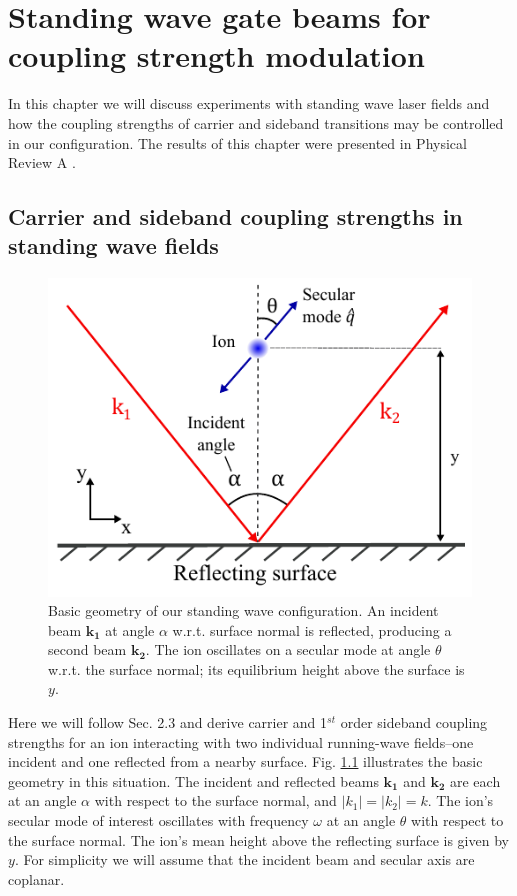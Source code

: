 \chapter{Standing wave gate beams for coupling strength modulation}

In this chapter we will discuss experiments with standing wave laser fields and how the coupling strengths of carrier and sideband transitions may be controlled in our configuration. The results of this chapter were presented in Physical Review A \cite{StandingWave}.   

\section{Carrier and sideband coupling strengths in standing wave fields}

\begin{figure}[t]
    \begin{center}
        \includegraphics{figures/4/Fig_SWgeometry2}
        \caption{\label{fig:SWgeometry} Basic geometry of our standing wave configuration. An incident beam $\mathbf{k_1}$ at angle $\alpha$ w.r.t. surface normal is reflected, producing a second beam $\mathbf{k_2}$. The ion oscillates on a secular mode at angle $\theta$ w.r.t. the surface normal; its equilibrium height above the surface is $y$.   }
    \end{center}
\end{figure}

Here we will follow Sec. 2.3 and derive carrier and 1$^{st}$ order sideband coupling strengths for an ion interacting with two individual running-wave fields--one incident and one reflected from a nearby surface. Fig. \ref{fig:SWgeometry} illustrates the basic geometry in this situation. The incident and reflected beams $\mathbf{k_1}$ and $\mathbf{k_2}$ are each at an angle $\alpha$ with respect to the surface normal, and $|k_1| = |k_2| = k$. The ion's secular mode of interest oscillates with frequency $\omega$ at an angle $\theta$ with respect to the surface normal. The ion's mean height above the reflecting surface is given by $y$. For simplicity we will assume that the incident beam and secular axis are coplanar. 

